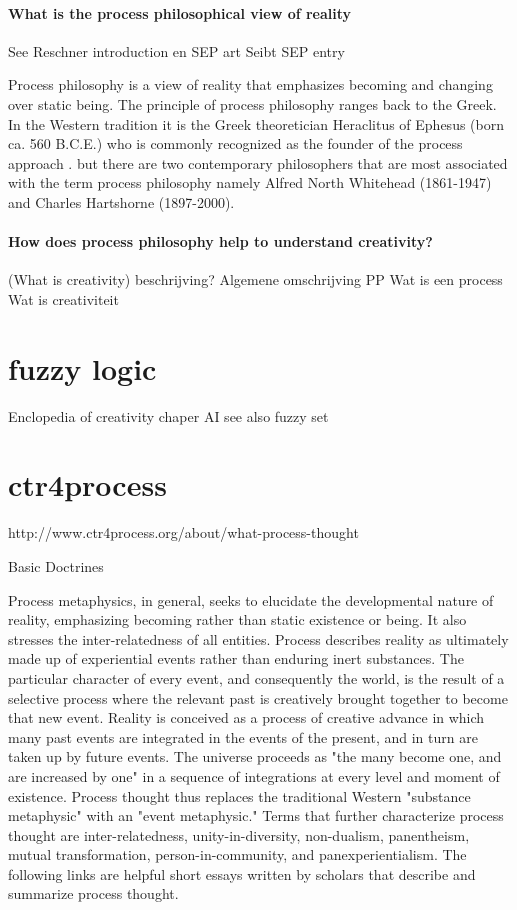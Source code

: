 \documentclass[a4paper]{Thesis}
\begin{document}
\paragraph{What is the process philosophical view of reality}
See Reschner introduction en SEP art \cite{Rescher-2012-sep}
Seibt SEP entry \cite{Seibt-2013-sep}


Process philosophy is a view of reality that emphasizes becoming and changing over static being. The principle of process philosophy ranges back to the Greek.
In the Western tradition it is the Greek theoretician Heraclitus of Ephesus (born ca. 560 B.C.E.) who is commonly recognized as the founder of the process approach \cite{Seibt-2013-sep}. 
 but there are two contemporary philosophers that are most associated with the term process philosophy namely Alfred North Whitehead (1861-1947) and Charles Hartshorne (1897-2000).



\paragraph{How does process philosophy help to understand creativity?}

\paragragph(What is creativity)
 beschrijving?
Algemene omschrijving PP
Wat is een process
Wat is creativiteit




\section{fuzzy logic}
Enclopedia of creativity chaper AI
see also fuzzy set


\section{ctr4process}
http://www.ctr4process.org/about/what-process-thought

Basic Doctrines

Process metaphysics, in general, seeks to elucidate the developmental nature of reality, emphasizing becoming rather than static existence or being. It also stresses the inter-relatedness of all entities. Process describes reality as ultimately made up of experiential events rather than enduring inert substances. The particular character of every event, and consequently the world, is the result of a selective process where the relevant past is creatively brought together to become that new event. Reality is conceived as a process of creative advance in which many past events are integrated in the events of the present, and in turn are taken up by future events. The universe proceeds as "the many become one, and are increased by one" in a sequence of integrations at every level and moment of existence. Process thought thus replaces the traditional Western "substance metaphysic" with an "event metaphysic." Terms that further characterize process thought are inter-relatedness, unity-in-diversity, non-dualism, panentheism, mutual transformation, person-in-community, and panexperientialism. The following links are helpful short essays written by scholars that describe and summarize process thought.
\end{document}
